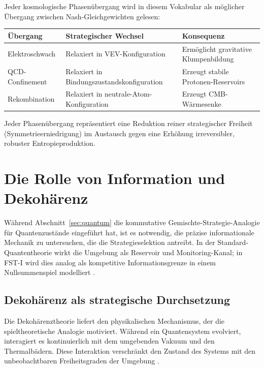 \documentclass[12pt,a4paper]{article}
\theoremstyle{remark}
\begin{document}
Jeder kosmologische Phasen\"ubergang wird in diesem Vokabular als m\"oglicher \"Ubergang zwischen Nash-Gleichgewichten gelesen:

\begin{center}
\begin{tabularx}{\textwidth}{@{}>{\raggedright\arraybackslash}p{3.4cm}YY@{}}
\toprule
\textbf{\"Ubergang} & \textbf{Strategischer Wechsel} & \textbf{Konsequenz} \\
\midrule
Elektroschwach & Relaxiert in VEV-Konfiguration & Erm\"oglicht gravitative Klumpenbildung \\
QCD-Confinement & Relaxiert in Bindungszustandskonfiguration & Erzeugt stabile Protonen-Reservoirs \\
Rekombination & Relaxiert in neutrale-Atom-Konfiguration & Erzeugt CMB-W\"armesenke \\
\bottomrule
\end{tabularx}
\end{center}

Jeder Phasen\"ubergang repr\"asentiert eine Reduktion reiner strategischer Freiheit (Symmetrieerniedrigung) im Austausch gegen eine Erh\"ohung irreversibler, robuster Entropieproduktion.

\section{Die Rolle von Information und Dekoh\"arenz}
\label{sec:decoherence}

W\"ahrend Abschnitt~\ref{sec:quantum} die kommutative Gemischte-Strategie-Analogie f\"ur Quantenzust\"ande eingef\"uhrt hat, ist es notwendig, die pr\"azise informationale Mechanik zu untersuchen, die die Strategieselektion antreibt. In der Standard-Quantentheorie wirkt die Umgebung als Reservoir und Monitoring-Kanal; in FST-I wird dies analog als kompetitive Informationsgrenze in einem Nullsummenspiel modelliert \citep{Zurek2003}.

\subsection{Dekoh\"arenz als strategische Durchsetzung}

Die Dekoh\"arenztheorie liefert den physikalischen Mechanismus, der die spieltheoretische Analogie motiviert. W\"ahrend ein Quantensystem evolviert, interagiert es kontinuierlich mit dem umgebenden Vakuum und den Thermalb\"adern. Diese Interaktion verschr\"ankt den Zustand des Systems mit den unbeobachtbaren Freiheitsgraden der Umgebung \citep{MeasurementClassical}.
\end{document}
